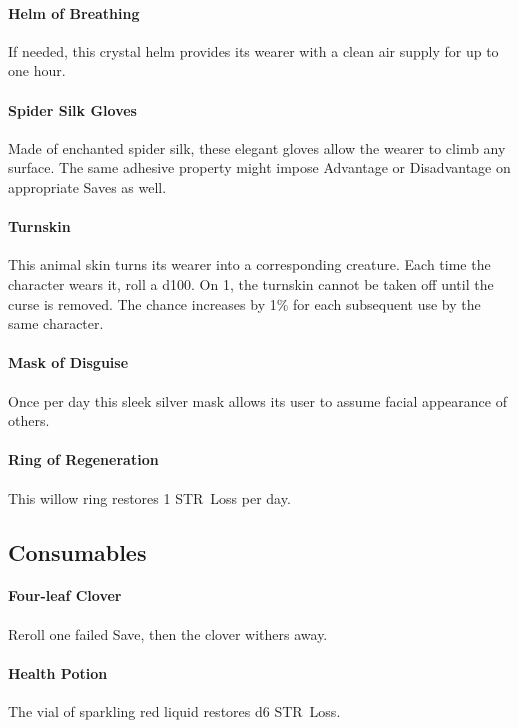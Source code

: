 \documentclass[itdr]{subfiles}
\begin{document}
\paragraph{Helm of Breathing}
If needed, this crystal helm provides its wearer with a clean air supply  for up to one hour.

\paragraph{Spider Silk Gloves}
Made of enchanted spider silk, these elegant gloves allow the wearer to climb any surface. The same adhesive property might impose Advantage or Disadvantage on appropriate Saves as well.

\paragraph{Turnskin}
This animal skin turns its wearer into a corresponding creature. Each time the character wears it, roll a d100. On 1, the turnskin cannot be taken off until the curse is removed. The chance increases by 1\% for each subsequent use by the same character.

\paragraph{Mask of Disguise}
Once per day this sleek silver mask allows its user to assume facial appearance of others.

\paragraph{Ring of Regeneration}
This willow ring restores 1 STR~Loss per day.



\subsection*{Consumables}

\paragraph{Four-leaf Clover}
Reroll one failed Save, then the clover withers away.

\paragraph{Health Potion}
The vial of sparkling red liquid restores d6 STR~Loss.
\end{document}

